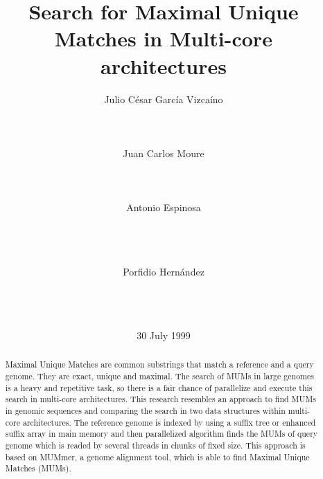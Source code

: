 \documentclass{acm_proc_article-sp}
\begin{document}
\title{Search for Maximal Unique Matches in Multi-core architectures}

%
\author{
\alignauthor Julio C\'esar Garc\'ia Vizca\'ino\\
       \\
       \\
       \\
\alignauthor Juan Carlos Moure\\
       \\
       \\
       \\
\alignauthor Antonio Espinosa\\
       \\
       \\
       \\
\and  %
\alignauthor Porfidio Hern\'andez\\
       \\
       \\
       \\
}
\date{30 July 1999}

\maketitle
\begin{abstract}
  Maximal Unique Matches are common substrings that match a reference and a query genome. They are exact, unique and maximal. The search of MUMs in large genomes is a heavy and repetitive task, so there is a fair chance of parallelize and execute this search in multi-core architectures. This research resembles an approach to find MUMs in genomic sequences and comparing the search in two data structures within multi-core architectures. The reference genome is indexed by using a suffix tree or enhanced suffix array in main memory and then parallelized algorithm finds the MUMs of query genome which is readed by several threads in chunks of fixed size. This approach is based on MUMmer, a genome alignment tool, which is able to find Maximal Unique Matches (MUMs). 
\end{abstract}
\end{document}
